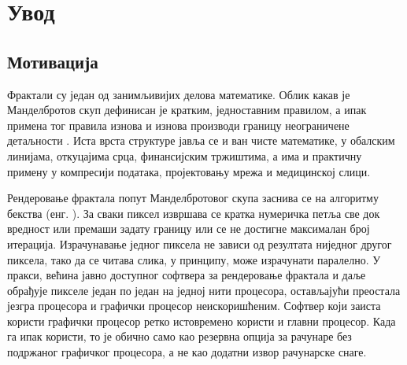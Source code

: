 \documentclass[serbian]{ftndiplomski}
\begin{document}

\clearpage
\thispagestyle{empty}
\tableofcontents

\clearpage
\setcounter{page}{1}

\chapter{Увод}
\label{ch:intro}

\section{Мотивација}
\label{sec:motivation}

Фрактали су један од занимљивијих делова математике. Облик какав је Манделбротов
скуп дефинисан је кратким, једноставним правилом, а ипак примена тог правила изнова и
изнова производи границу неограничене детаљности \cite{mandelbrot1982}. Иста врста
структуре јавља се и ван чисте математике, у обалским линијама, откуцајима срца,
финансијским тржиштима, а има и практичну примену у компресији података, пројектовању
мрежа и медицинској слици.

Рендеровање фрактала попут Манделбротовог скупа заснива се на алгоритму бекства
(енг. ). За сваки пиксел извршава се кратка нумеричка петља
све док вредност или премаши задату границу или се не достигне максималан број
итерација. Израчунавање једног пиксела не зависи од резултата ниједног другог пиксела,
тако да се читава слика, у принципу, може израчунати паралелно. У пракси, већина јавно
доступног софтвера за рендеровање фрактала и даље обрађује пикселе један по један на
једној нити процесора, остављајући преостала језгра процесора и графички процесор
неискоришћеним. Софтвер који заиста користи графички процесор ретко истовремено користи
и главни процесор. Када га ипак користи, то је обично само као резервна опција за
рачунаре без подржаног графичког процесора, а не као додатни извор рачунарске снаге.
\end{document}
